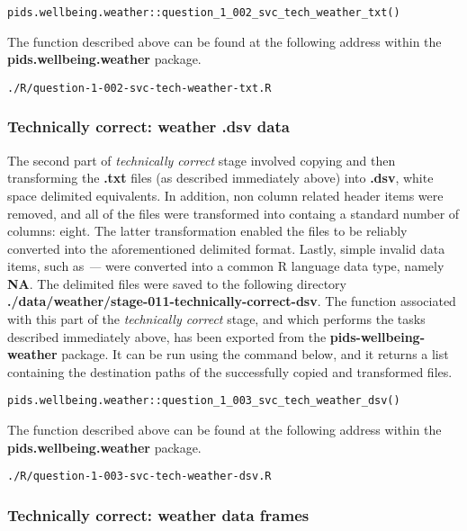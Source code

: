 \documentclass[12pt, oneside, openany]{book}
\begin{document}
\begin{verbatim}
pids.wellbeing.weather::question_1_002_svc_tech_weather_txt()
\end{verbatim}

The function described above can be found at the following address within the \textbf{pids.wellbeing.weather} package.

\begin{verbatim}
./R/question-1-002-svc-tech-weather-txt.R
\end{verbatim}

\subsubsection*{Technically correct: weather .dsv data}

The second part of \emph{technically correct} stage involved copying and then transforming the \textbf{.txt} files (as described immediately above) into \textbf{.dsv}, white space delimited equivalents. In addition, non column related header items were removed, and all of the files were transformed into containg a standard number of columns: eight. The latter transformation enabled the files to be reliably converted into the aforementioned delimited format. Lastly, simple invalid data items, such as \emph{---} were converted into a common R language data type, namely \textbf{NA}. The delimited files were saved to the following directory \textbf{./data/weather/stage-011-technically-correct-dsv}. The function associated with this part of the \emph{technically correct} stage, and which performs the tasks described immediately above, has been exported from the \textbf{pids-wellbeing-weather} package. It can be run using the command below, and it returns a list containing the destination paths of the successfully copied and transformed files.

\begin{verbatim}
pids.wellbeing.weather::question_1_003_svc_tech_weather_dsv()
\end{verbatim}

The function described above can be found at the following address within the \textbf{pids.wellbeing.weather} package.

\begin{verbatim}
./R/question-1-003-svc-tech-weather-dsv.R
\end{verbatim}

\subsubsection*{Technically correct: weather data frames}
\end{document}
